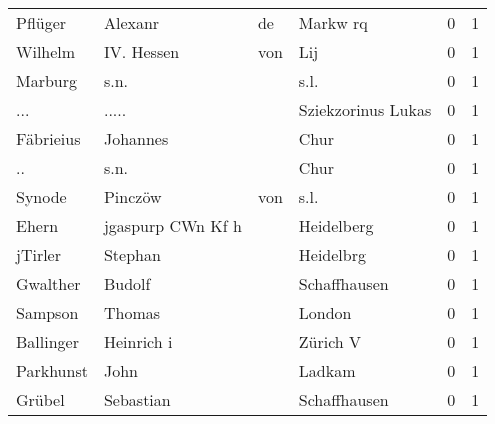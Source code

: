 \documentclass[10pt,a4paper,landscape]{article}
\begin{document}
\begin{longtable}{llllrr}
                  Pflüger &                            Alexanr &          de &                                    Markw rq &          0 &         1 \\
                  Wilhelm &                        IV.  Hessen &         von &                                         Lij &          0 &         1 \\
                  Marburg &                               s.n. &             &                                        s.l. &          0 &         1 \\
                      ... &                              ..... &             &                          Sziekzorinus Lukas &          0 &         1 \\
                Fäbrieius &                           Johannes &             &                                        Chur &          0 &         1 \\
                       .. &                               s.n. &             &                                        Chur &          0 &         1 \\
                   Synode &                            Pinczöw &         von &                                        s.l. &          0 &         1 \\
                    Ehern &                  jgaspurp CWn Kf h &             &                                  Heidelberg &          0 &         1 \\
                  jTirler &                            Stephan &             &                                   Heidelbrg &          0 &         1 \\
                 Gwalther &                             Budolf &             &                                Schaffhausen &          0 &         1 \\
                  Sampson &                             Thomas &             &                                      London &          0 &         1 \\
                Ballinger &                         Heinrich i &             &                                    Zürich V &          0 &         1 \\
                Parkhunst &                               John &             &                                      Ladkam &          0 &         1 \\
                   Grübel &                          Sebastian &             &                                Schaffhausen &          0 &         1 \\

\end{longtable}
\end{document}
